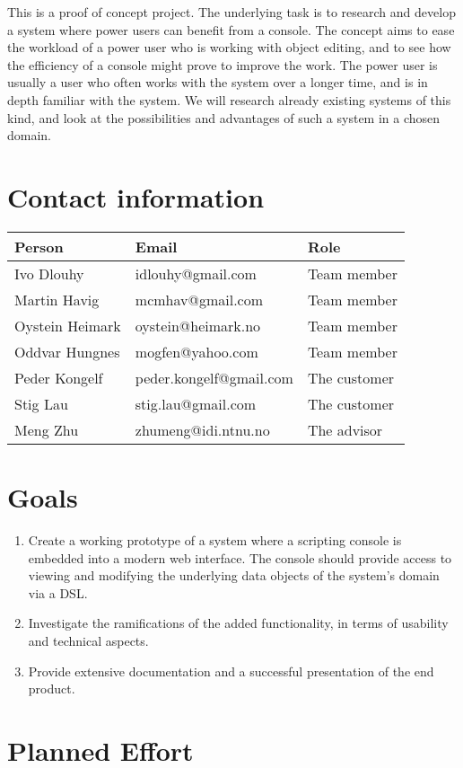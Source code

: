 This is a proof of concept project. The underlying task is to research and develop a system where power users can benefit from a console.  The concept aims to ease the workload of a power user who is working with object editing, and to see how the efficiency of a console might prove to improve the work. The power user is usually a user who often works with the system over a longer time, and is in depth familiar with the system. We will research already existing systems of this kind, and look at the possibilities and advantages of such a system in a chosen domain.


\section{Contact information}
\begin{tabular}{ | l | l | l | }
  \hline
  \textbf{Person} & \textbf{Email} & \textbf{Role} \\ \hline
  Ivo Dlouhy & idlouhy@gmail.com & Team member \\ \hline
  Martin Havig & mcmhav@gmail.com & Team member \\ \hline
  Oystein Heimark & oystein@heimark.no & Team member \\ \hline
  Oddvar Hungnes & mogfen@yahoo.com & Team member \\ \hline
  Peder Kongelf & peder.kongelf@gmail.com & The customer \\ \hline
  Stig Lau & stig.lau@gmail.com & The customer \\ \hline
  Meng Zhu & zhumeng@idi.ntnu.no & The advisor \\ \hline
\end{tabular}


\section{Goals}
\begin{enumerate}
  \item Create a working prototype of a system where a scripting console is embedded into a modern web interface. The console should provide access to viewing and modifying the underlying data objects of the system's domain via a DSL.
  \item Investigate the ramifications of the added functionality, in terms of usability and technical aspects.
  \item Provide extensive documentation and a successful presentation of the end product.
\end{enumerate}

\section{Planned Effort}
